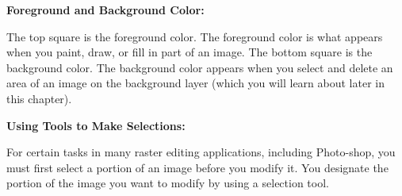 \documentclass{report}
\begin{document}
    \bigbreak \noindent \bigbreak \noindent 
    \begin{large}
      \textbf{Foreground and Background Color:}
    \end{large}
    \bigbreak \noindent 
    The top square is the foreground color. The foreground color is what appears when you paint, draw, or fill in part of an image. The bottom square is the background color. The background color appears when you select and delete an area of an image on the background layer (which you will learn about later in this chapter).
    \bigbreak \noindent 

    \bigbreak \noindent \bigbreak \noindent 
    \begin{Large}
      \textbf{Using Tools to Make Selections:}
    \end{Large}
    \bigbreak \noindent 
    For certain tasks in many raster editing applications, including Photo-shop, you must first select a portion of an image before you modify it. You designate the portion of the image you want to modify by using a selection tool.
    \bigbreak \noindent 
\end{document}
